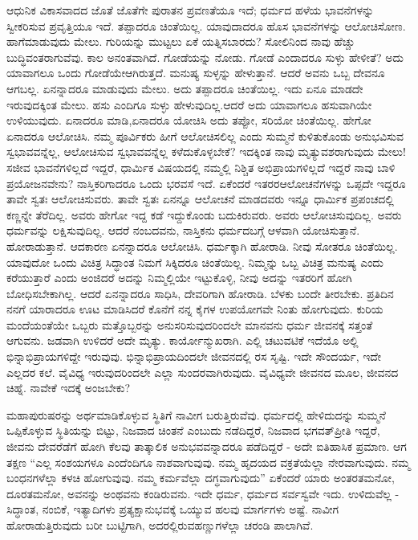 ಆಧುನಿಕ ವಿಕಾಸವಾದದ ಜೊತೆ ಜೊತೆಗೇ ಪುರಾತನ ಪ್ರವಣತೆಯೂ  ಇದೆ; ಧರ್ಮದ ಹಳೆಯ ಭಾವನೆಗಳನ್ನು ಸ್ವೀಕರಿಸುವ ಪ್ರವೃತ್ತಿಯೂ ಇದೆ. ತಪ್ಪಾದರೂ ಚಿಂತೆಯಿಲ್ಲ. ಯಾವುದಾದರೂ ಹೊಸ ಭಾವನೆಗಳನ್ನು ಆಲೋಚಿಸೋಣ. ಹಾಗೆ\break ಮಾಡುವುದು ಮೇಲು. ಗುರಿಯನ್ನು ಮುಟ್ಟಲು ಏಕೆ ಯತ್ನಿಸಬಾರದು? ಸೋಲಿನಿಂದ ನಾವು ಹೆಚ್ಚು ಬುದ್ಧಿವಂತರಾಗುವೆವು. ಕಾಲ ಅನಂತವಾಗಿದೆ. ಗೋಡೆಯನ್ನು ನೋಡು. ಗೋಡೆ ಎಂದಾದರೂ ಸುಳ್ಳು ಹೇಳೀತೆ? ಅದು ಯಾವಾಗಲೂ ಒಂದು ಗೋಡೆಯೇ\break ಆಗಿರುತ್ತದೆ. ಮನುಷ್ಯ ಸುಳ್ಳನ್ನು ಹೇಳುತ್ತಾನೆ. ಆದರೆ ಅವನು ಒಬ್ಬ ದೇವನೂ ಆಗಬಲ್ಲ. ಏನನ್ನಾದರೂ ಮಾಡುವುದು ಮೇಲು. ಅದು ತಪ್ಪಾದರೂ ಚಿಂತೆಯಿಲ್ಲ. ಇದು ಏನೂ ಮಾಡದೇ ಇರುವುದಕ್ಕಿಂತ ಮೇಲು. ಹಸು ಎಂದಿಗೂ ಸುಳ್ಳು ಹೇಳುವುದಿಲ್ಲ.\break ಆದರೆ ಅದು ಯಾವಾಗಲೂ ಹಸುವಾಗಿಯೇ ಉಳಿಯುವುದು. ಏನಾದರೂ ಮಾಡಿ,\break ಏನಾದರೂ ಯೋಚಿಸಿ ಅದು ತಪ್ಪೋ, ಸರಿಯೋ ಚಿಂತೆಯಿಲ್ಲ. ಹೇಗೋ ಏನಾದರೂ ಆಲೋಚಿಸಿ. ನಮ್ಮ ಪೂರ್ವಿಕರು ಹೀಗೆ ಆಲೋಚಿಸಲಿಲ್ಲ ಎಂದು ಸುಮ್ಮನೆ ಕುಳಿತುಕೊಂಡು ಅನುಭವಿಸುವ ಸ್ವಭಾವವನ್ನೆಲ್ಲ, ಆಲೋಚಿಸುವ ಸ್ವಭಾವವನ್ನೆಲ್ಲ ಕಳೆದುಕೊಳ್ಳಬೇಕೆ? ಇದಕ್ಕಿಂತ ನಾವು ಮೃತ್ಯುವಶರಾಗುವುದು ಮೇಲು! ಸಜೀವ ಭಾವನೆಗಳಿಲ್ಲದೆ ಇದ್ದರೆ, ಧಾರ್ಮಿಕ ವಿಷಯದಲ್ಲಿ ನಮ್ಮಲ್ಲಿ ನಿಶ್ಚಿತ ಅಭಿಪ್ರಾಯಗಳಿಲ್ಲದೆ ಇದ್ದರೆ ನಾವು ಬಾಳಿ ಪ್ರಯೋಜನವೇನು? ನಾಸ್ತಿಕರಿಗಾದರೂ ಒಂದು ಭರವಸೆ ಇದೆ. ಏಕೆಂದರೆ ಇತರರ\break ಆಲೋಚನೆಗಳನ್ನು ಒಪ್ಪದೇ ಇದ್ದರೂ ತಾವೇ ಸ್ವತಃ ಆಲೋಚಿಸುವರು. ತಾವೇ ಸ್ವತಃ ಏನನ್ನೂ ಆಲೋಚನೆ ಮಾಡದವರು ಇನ್ನೂ ಧಾರ್ಮಿಕ ಪ್ರಪಂಚದಲ್ಲಿ ಕಣ್ಣನ್ನೇ ತೆರೆದಿಲ್ಲ. ಅವರು ಹೇಗೋ ಇದ್ದ ಕಡೆ ಇದ್ದುಕೊಂಡು ಬದುಕಿರುವರು. ಅವರು ಆಲೋಚಿಸುವು\-ದಿಲ್ಲ. ಅವರು ಧರ್ಮವನ್ನು ಲಕ್ಷಿಸುವುದಿಲ್ಲ. ಆದರೆ ನಂಬದವನು, ನಾಸ್ತಿಕನು ಧರ್ಮದ\break ಬಗ್ಗೆ ಆಳವಾಗಿ ಯೋಚಿಸುತ್ತಾನೆ. ಹೋರಾಡುತ್ತಾನೆ. ಆದಕಾರಣ ಏನನ್ನಾದರೂ ಆಲೋಚಿಸಿ. ಧರ್ಮಕ್ಕಾಗಿ ಹೋರಾಡಿ. ನೀವು ಸೋತರೂ ಚಿಂತೆಯಿಲ್ಲ. ಯಾವುದೋ ಒಂದು ವಿಚಿತ್ರ ಸಿದ್ಧಾಂತ ನಿಮಗೆ ಸಿಕ್ಕಿದರೂ ಚಿಂತೆಯಿಲ್ಲ. ನಿಮ್ಮನ್ನು ಒಬ್ಬ ವಿಚಿತ್ರ ಮನುಷ್ಯ ಎಂದು ಕರೆಯುತ್ತಾರೆ ಎಂದು ಅಂಜಿದರೆ ಅದನ್ನು ನಿಮ್ಮಲ್ಲಿಯೇ ಇಟ್ಟುಕೊಳ್ಳಿ, ನೀವು ಅದನ್ನು ಇತರರಿಗೆ ಹೋಗಿ ಬೋಧಿಸಬೇಕಾಗಿಲ್ಲ. ಆದರೆ ಏನನ್ನಾದರೂ ಸಾಧಿಸಿ, ದೇವರಿಗಾಗಿ ಹೋರಾಡಿ. ಬೆಳಕು ಬಂದೇ ತೀರಬೇಕು. ಪ್ರತಿದಿನ ನನಗೆ ಯಾರಾದರೂ ಊಟ ಮಾಡಿಸಿದರೆ ಕೊನೆಗೆ ನನ್ನ ಕೈಗಳ ಉಪಯೋಗವೇ ನಿಂತು ಹೋಗುವುದು. ಕುರಿಯ ಮಂದೆಯಂತೆಯೇ ಒಬ್ಬರು ಮತ್ತೊಬ್ಬರನ್ನು ಅನುಸರಿಸುವುದರಿಂದಲೇ ಮಾನವನು ಧರ್ಮ ಜೀವನಕ್ಕೆ ಸತ್ತಂತೆ ಆಗುವನು. ಜಡವಾಗಿ ಉಳಿದರೆ ಅದೇ ಮೃತ್ಯು. ಕಾರ್ಯೋನ್ಮುಖರಾಗಿ. ಎಲ್ಲಿ ಚಟುವಟಿಕೆ ಇದೆಯೊ ಅಲ್ಲಿ ಭಿನ್ನಾಭಿಪ್ರಾಯಗಳಿದ್ದೇ ಇರುವುವು. ಭಿನ್ನಾಭಿಪ್ರಾಯದಿಂದಲೇ ಜೀವನದಲ್ಲಿ ರಸ ಸೃಷ್ಟಿ. ಇದೇ ಸೌಂದರ್ಯ, ಇದೇ ಎಲ್ಲದರ ಕಲೆ. ವೈವಿಧ್ಯ ಇರುವುದರಿಂದಲೇ ಎಲ್ಲಾ ಸುಂದರವಾಗಿರುವುದು. ವೈವಿಧ್ಯವೇ ಜೀವನದ ಮೂಲ, ಜೀವನದ ಚಿಹ್ನೆ. ನಾವೇಕೆ ಇದಕ್ಕೆ ಅಂಜಬೇಕು?

ಮಹಾಪುರುಷರನ್ನು ಅರ್ಥಮಾಡಿಕೊಳ್ಳುವ ಸ್ಥಿತಿಗೆ ನಾವೀಗ ಬರುತ್ತಿರುವೆವು. ಧರ್ಮದಲ್ಲಿ ಹೇಳಿದುದನ್ನು ಸುಮ್ಮನೆ ಒಪ್ಪಿಕೊಳ್ಳುವ ಸ್ಥಿತಿಯನ್ನು ಬಿಟ್ಟು, ನಿಜವಾದ ಚಿಂತನೆ ಎಂಬುದು ನಡೆದಿದ್ದರೆ, ನಿಜವಾದ ಭಗವತ್​ಪ್ರೀತಿ ಇದ್ದರೆ, ಜೀವನು ದೇವರೆಡೆಗೆ ಹೋಗಿ ಕೆಲವು ತಾತ್ಕಾಲಿಕ ಅನುಭವವನ್ನಾದರೂ ಪಡೆದಿದ್ದರೆ - ಅದೇ ಐತಿಹಾಸಿಕ ಪ್ರಮಾಣ. ಆಗ ತಕ್ಷಣ “ಎಲ್ಲ ಸಂಶಯಗಳೂ ಎಂದೆಂದಿಗೂ ನಾಶವಾಗುವುವು. ನಮ್ಮ ಹೃದಯದ ವಕ್ರತೆಯೆಲ್ಲಾ ನೇರವಾಗುವುದು. ನಮ್ಮ ಬಂಧನಗಳೆಲ್ಲಾ ಕಳಚಿ ಹೋಗುವುವು. ನಮ್ಮ ಕರ್ಮವೆಲ್ಲಾ ದಗ್ಧವಾಗುವುದು” ಏಕೆಂದರೆ ಯಾರು ಅಂತರತಮನೋ, ದೂರತಮನೋ, ಅವನನ್ನು ಅಂಥವನು ಕಂಡಿರುವನು. ಇದೇ ಧರ್ಮ, ಧರ್ಮದ ಸರ್ವಸ್ವವೇ ಇದು. ಉಳಿದುವೆಲ್ಲ - ಸಿದ್ಧಾಂತ, ನಂಬಿಕೆ, ಇತ್ಯಾದಿಗಳು ಪ್ರತ್ಯಕ್ಷಾನುಭವಕ್ಕೆ ಒಯ್ಯುವ ಹಲವು ಮಾರ್ಗಗಳು ಅಷ್ಟೆ. ನಾವೀಗ ಹೋರಾಡುತ್ತಿರುವುದು ಬರೀ ಬುಟ್ಟಿಗಾಗಿ, ಅದರಲ್ಲಿರುವ\break ಹಣ್ಣುಗಳೆಲ್ಲಾ ಚರಂಡಿ ಪಾಲಾಗಿವೆ.

